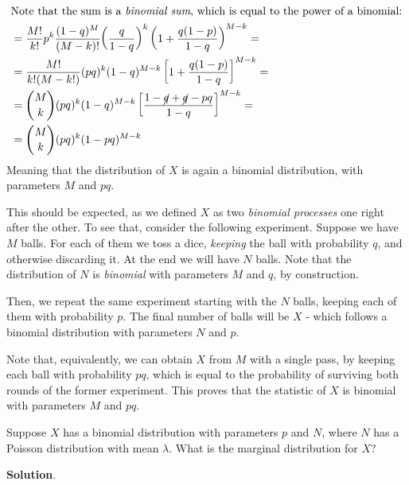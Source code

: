 \documentclass[../template.tex]{subfiles}
\begin{document}
\begin{example}
\begin{align*}
        \shortintertext{Note that the sum is a \textit{binomial sum}, which is equal to the power of a binomial:}
        &= \frac{M!}{k!} p^k \frac{(1-q)^M}{{(M-k)!}} {\left(\frac{q}{1-q} \right)^k} \left(1+ \frac{q(1-p)}{1-q} \right)^{M-k} =\\
        &= \frac{M!}{k! (M-k!)} (pq)^k (1-q)^{M-k} \left[1+\frac{q(1-p)}{1-q} \right]^{M-k} =\\
        &= {M \choose k} (pq)^k (1-q)^{M-k} \left[\frac{1-\cancel{q}+\cancel{q}-pq}{1-q} \right]^{M-k} =\\
        &= {M\choose k}(pq)^k (1-pq)^{M-k}
    \end{align*}
    Meaning that the distribution of $X$ is again a binomial distribution, with parameters $M$ and $pq$.

    \medskip

    This should be expected, as we defined $X$ as two \textit{binomial processes} one right after the other.  To see that, consider the following experiment. Suppose we have $M$ balls. For each of them we toss a dice, \textit{keeping} the ball with probability $q$, and otherwise discarding it. At the end we will have $N$ balls. Note that the distribution of $N$ is \textit{binomial} with parameters $M$ and $q$, by construction.

    \medskip

    Then, we repeat the same experiment starting with the $N$ balls, keeping each of them with probability $p$. The final number of balls will be $X$ - which follows a binomial distribution with parameters $N$ and $p$.

    \medskip

    Note that, equivalently, we can obtain $X$ from $M$ with a single pass, by keeping each ball with probability $p q$, which is equal to the probability of surviving both rounds of the former experiment. This proves that the statistic of $X$ is binomial with parameters $M$ and $pq$.
\end{example}

\begin{exo}
    Suppose $X$ has a binomial distribution with parameters $p$ and $N$, where $N$ has a Poisson distribution with mean $\lambda$. What is the marginal distribution for $X$?

    \medskip

    \textbf{Solution}. 
\end{exo}
\end{document}
